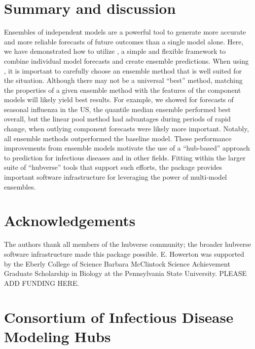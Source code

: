 \documentclass[
  article,
  shortnames,
  notitle]{jss}
\begin{document}
\section{Summary and discussion}\label{sec-conclusions}

Ensembles of independent models are a powerful tool to generate more
accurate and more reliable forecasts of future outcomes than a single
model alone. Here, we have demonstrated how to utilize
, a simple and flexible framework to combine
individual model forecasts and create ensemble predictions. When using
, it is important to carefully choose an ensemble
method that is well suited for the situation. Although there may not be
a universal ``best'' method, matching the properties of a given ensemble
method with the features of the component models will likely yield best
results. For example, we showed for forecasts of seasonal influenza in
the US, the quantile median ensemble performed best overall, but the
linear pool method had advantages during periods of rapid change, when
outlying component forecasts were likely more important. Notably, all
ensemble methods outperformed the baseline model. These performance
improvements from ensemble models motivate the use of a ``hub-based''
approach to prediction for infectious diseases and in other fields.
Fitting within the larger suite of ``hubverse'' tools that support such
efforts, the  package provides important software
infrastructure for leveraging the power of multi-model ensembles.

\section*{Acknowledgements}\label{acknowledgements}

The authors thank all members of the hubverse community; the broader
hubverse software infrastructure made this package possible. E. Howerton
was supported by the Eberly College of Science Barbara McClintock
Science Achievement Graduate Scholarship in Biology at the Pennsylvania
State University. PLEASE ADD FUNDING HERE.

\section*{Consortium of Infectious Disease Modeling
Hubs}\label{consortium-of-infectious-disease-modeling-hubs}
\end{document}
